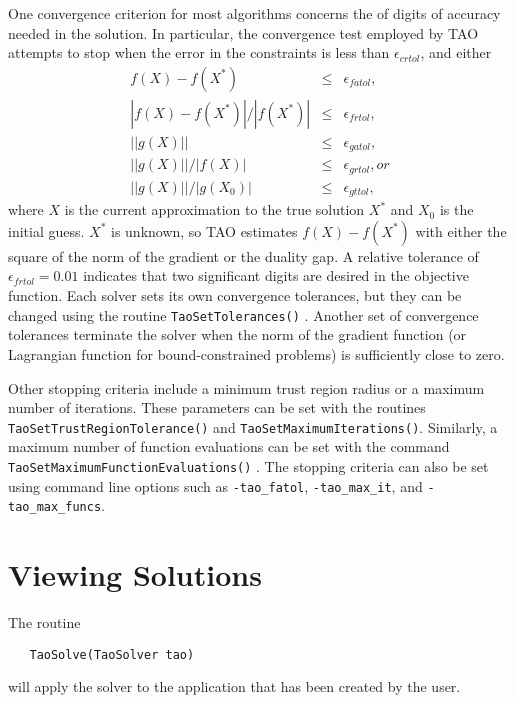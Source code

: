 One convergence criterion for most algorithms concerns the
of digits of accuracy needed in the solution.  In particular,
the convergence test employed by TAO attempts to stop when
the error in the constraints is less than $\epsilon_{crtol}$,
 and either
\[
\begin{array}{lcl}
f(X) - f(X^*)  &\leq& \epsilon_{fatol}, \\
|f(X) - f(X^*)| / |f(X^*)| &\leq& \epsilon_{frtol},\\
||g(X)|| &\leq& \epsilon_{gatol}, \\
||g(X)||/|f(X)| &\leq& \epsilon_{grtol}, or \\
||g(X)||/|g(X_0)| &\leq& \epsilon_{gttol},
\end{array}
\]
where $X$ is the current approximation to the true solution $X^*$
and $X_0$ is the initial guess.
$X^*$ is unknown, so TAO estimates $f(X) - f(X^*)$ with either 
the square of the norm of the gradient or the duality gap.
A relative tolerance of $\epsilon_{frtol}=0.01$ indicates that two
significant digits are desired in the objective function.
Each solver sets its own  convergence tolerances, but they can
be changed using the routine
{\tt TaoSetTolerances()} 
. 
Another set of convergence tolerances 
terminate the solver when the norm of the gradient function
(or Lagrangian function for bound-constrained problems)
is sufficiently close to zero.

Other stopping criteria include a minimum trust region radius or 
a maximum number of iterations.  These parameters can be set with
the routines {\tt Tao\-Set\-Trust\-Region\-Tolerance()}
and {\tt Tao\-Set\-Max\-imum\-Iter\-ations()}.
Similarly, a maximum number of function evaluations can be set 
with the command 
{\tt Tao\-Set\-Max\-imum\-Func\-tion\-Evaluations()}
.  The stopping criteria can
also be set using command line options such as \texttt{-tao\_fatol}, 
\texttt{-tao\_max\_it}, and \texttt{-tao\_max\_funcs}.

\section{Viewing Solutions}

The routine
\begin{verbatim}
   TaoSolve(TaoSolver tao)
\end{verbatim}
\noindent
will apply the solver to the application that has been created by the user.

